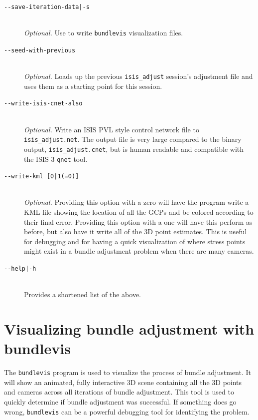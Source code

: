 \begin{description}
\item[\texttt{-\/-save-iteration-data|-s}] \hfill \\
  \emph{Optional.} Use to write {\tt bundlevis} visualization files.

\item[\texttt{-\/-seed-with-previous}] \hfill \\
  \emph{Optional.} Loads up the previous {\tt isis\_adjust} session's
  adjustment file and uses them as a starting point for this session.

\item[\texttt{-\/-write-isis-cnet-also}] \hfill \\
  \emph{Optional.} Write an \ac{ISIS} \ac{PVL} style control network file to
  \texttt{isis\_adjust.net}. The output file is very large compared to
  the binary output, \texttt{isis\_adjust.cnet}, but is human readable
  and compatible with the \ac{ISIS} 3 \texttt{qnet} tool.

\item[\texttt{-\/-write-kml [0|1(=0)]}] \hfill \\
  \emph{Optional.} Providing this option with a zero will have the
  program write a \ac{KML} file showing the location of all the \acp{GCP}
  and be colored according to their final error. Providing this
  option with a one will have this perform as before, but also have it
  write all of the 3D point estimates. This is useful for debugging and
  for having a quick visualization of where stress points might exist in
  a bundle adjustment problem when there are many cameras.

\item[\texttt{-\/-help|-h}] \hfill \\
  Provides a shortened list of the above.

\end{description}

\section{Visualizing bundle adjustment with bundlevis}

The \texttt{bundlevis} program is used to visualize the process of
bundle adjustment. It will show an animated, fully interactive 3D
scene containing all the 3D points and cameras across all iterations
of bundle adjustment.  This tool is used to quickly determine if
bundle adjustment was successful.  If something does go wrong,
\texttt{bundlevis} can be a powerful debugging tool for identifying
the problem.

